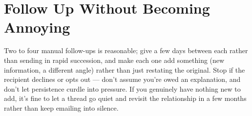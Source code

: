 \section{Follow Up Without Becoming Annoying}

Two to four manual follow-ups is reasonable; give a few days between each rather than sending in rapid
succession, and make each one add something (new information, a different angle) rather than just restating the
original. Stop if the recipient declines or opts out — don't assume you're owed an explanation, and don't let
persistence curdle into pressure. If you genuinely have nothing new to add, it's fine to let a thread go quiet
and revisit the relationship in a few months rather than keep emailing into silence.

